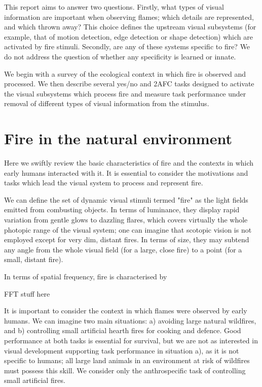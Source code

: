 \documentclass[a4paper]{article}
\begin{document}
This report aims to answer two questions. Firstly, what types of visual information are important when observing flames; which details are represented, and which thrown away? This choice defines the upstream visual subsystems (for example, that of motion detection, edge detection or shape detection) which are activated by fire stimuli. Secondly, are any of these systems specific to fire? We do not address the question of whether any specificity is learned or innate.

We begin with a survey of the ecological context in which fire is observed and processed. We then describe several yes/no and 2AFC tasks designed to activate the visual subsystems which process fire and measure task performance under removal of different types of visual information from the stimulus.

\section{Fire in the natural environment}

Here we swiftly review the basic characteristics of fire and the contexts in which early humans interacted with it. It is essential to consider the motivations and tasks which lead the visual system to process and represent fire.

We can define the set of dynamic visual stimuli termed "fire" as the light fields emitted from combusting objects. In terms of luminance, they display rapid variation from gentle glows to dazzling flares, which covers virtually the whole photopic range of the visual system; one can imagine that scotopic vision is not employed except for very dim, distant fires. In terms of size, they may subtend any angle from the whole visual field (for a large, close fire) to a point (for a small, distant fire).

In terms of spatial frequency, fire is characterised by 

FFT stuff here

It is important to consider the context in which flames were observed by early humans. We can imagine two main situations: a) avoiding large natural wildfires, and b) controlling small artificial hearth fires for cooking and defence. Good performance at both tasks is essential for survival, but we are not as interested in visual development supporting task performance in situation a), as it is not specific to humans; all large land animals in an environment at risk of wildfires must possess this skill. We consider only the anthrospecific task of controlling small artificial fires.
\end{document}
